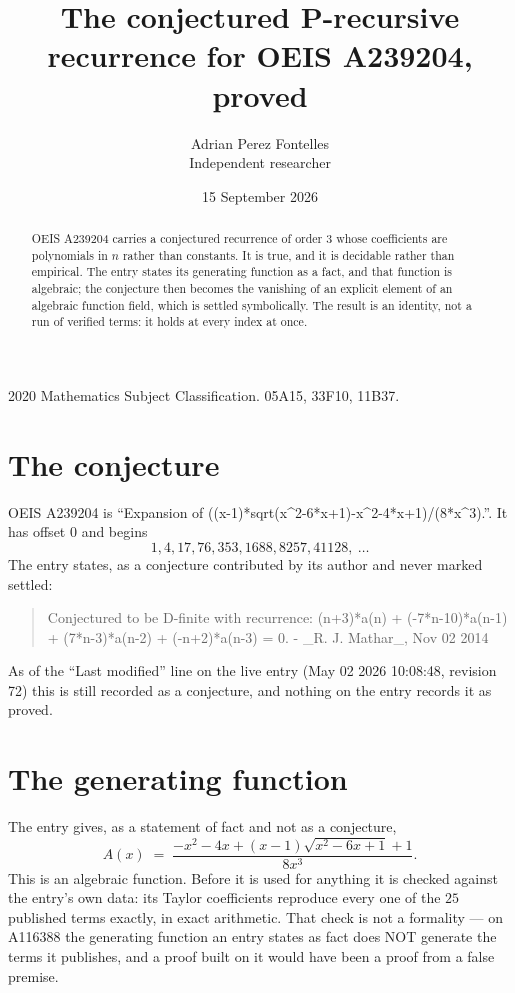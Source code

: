 \documentclass[11pt,a4paper]{article}
\title{The conjectured P-recursive recurrence for OEIS A239204, proved}
\author{Adrian Perez Fontelles\\ \small Independent researcher}
\date{15 September 2026}
\theoremstyle{plain}
\theoremstyle{definition}
\begin{document}
\maketitle

\begin{abstract}
OEIS A239204 carries a conjectured recurrence of order $3$ whose coefficients are polynomials in
$n$ rather than constants. It is true, and it is decidable rather than empirical. The entry
states its generating function as a fact, and that function is algebraic; the conjecture then
becomes the vanishing of an explicit element of an algebraic function field, which is settled
symbolically. The result is an identity, not a run of verified terms: it holds at every index
at once.
\end{abstract}

\noindent\small 2020 Mathematics Subject Classification. 05A15, 33F10, 11B37.\normalsize

\section{The conjecture}

OEIS A239204 is ``Expansion of ((x-1)*sqrt(x\^{}2-6*x+1)-x\^{}2-4*x+1)/(8*x\^{}3).''. It has offset $0$ and begins
\[
1, 4, 17, 76, 353, 1688, 8257, 41128,\ \dots
\]
The entry states, as a conjecture contributed by its author and never marked settled:
\begin{quote}\raggedright\small
Conjectured to be D-finite with recurrence: (n+3)*a(n) + (-7*n-10)*a(n-1) + (7*n-3)*a(n-2) + (-n+2)*a(n-3) = 0. - \_R. J. Mathar\_, Nov 02 2014
\end{quote}
As of the ``Last modified'' line on the live entry (May 02 2026 10:08:48, revision 72)
this is still recorded as a conjecture, and nothing on the entry records it as proved.

\section{The generating function}

The entry gives, as a statement of fact and not as a conjecture,
\[
A(x)\;=\;\frac{- x^{2} - 4 x + \left(x - 1\right) \sqrt{x^{2} - 6 x + 1} + 1}{8 x^{3}} .
\]
This is an algebraic function. Before it is used for anything it is checked against the entry's
own data: its Taylor coefficients reproduce every one of the $25$ published terms
exactly, in exact arithmetic. That check is not a formality --- on A116388 the generating
function an entry states as fact does NOT generate the terms it publishes, and a proof built on
it would have been a proof from a false premise.
\end{document}
